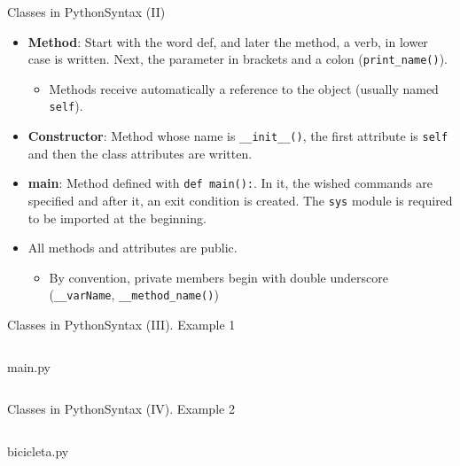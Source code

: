 \documentclass[10pt,compress]{beamer} %
\begin{document}
\begin{frame}{Classes in Python}{Syntax (II)}
\begin{itemize}
		\item \textbf{Method}: Start with the word \alert{def}, and later the method, a verb, in lower case is written. Next, the parameter in brackets and a colon (\texttt{print\_name()}).
   \begin{itemize}
   \item Methods receive automatically a reference to the object (usually named \texttt{self}).
   \end{itemize}
		\item \textbf{Constructor}: Method whose name is \texttt{\_\_init\_\_()}, the first attribute is \texttt{self} and then the class attributes are written.

		\item \textbf{main}: Method defined with \texttt{def main():}. In it, the wished commands are specified and after it, an exit condition is created. The \texttt{sys} module  is required to be imported at the beginning. 
		\item All methods and attributes are public.
			\begin{itemize}
				\item By convention, private members begin with double underscore (\texttt{\_\_varName}, \texttt{\_\_method\_name()})
			\end{itemize}
\end{itemize}			
\end{frame}


\begin{frame}{Classes in Python}{Syntax (III). Example 1}
    \begin{columns}
			\begin{block}{main.py}
			\vspace{-0.3cm} 
			\end{block}
	\end{columns}				 	
\end{frame}

\begin{frame}{Classes in Python}{Syntax (IV). Example 2}
\vspace{-0.2cm}
    \begin{columns}
			\begin{block}{bicicleta.py}
			\vspace{-0.3cm} 
			\vspace{-0.3cm} 
			\end{block}
	\end{columns}				 	
\end{frame}
\end{document}
